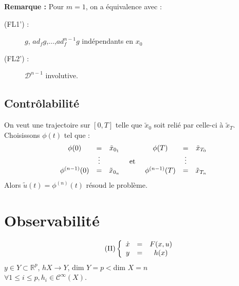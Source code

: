 \textbf{Remarque :} Pour $m=1$, on a équivalence avec :
\begin{description}
	\item[(FL1') :] $g$, $ad_fg$,...,$ad_f^{n-1}g$ indépendants en $x_0$
	\item[(FL2') :] $\mathcal{D}^{n-1}$ involutive.
\end{description}


\subsection{Contrôlabilité}
On veut une trajectoire sur $[0,T]$ telle que $\tilde{x}_0$ soit relié par celle-ci à $\tilde{x}_T$.\\
Choisissons $\phi(t)$ tel que : \[\begin{array}{c c c c c c c}
\phi(0)&=&\tilde{x}_{0_1} & & \phi(T)&=&\tilde{x}_{T_0}\\
   &\vdots& &\text{ et }&  &\vdots&\\
\phi^{(n-1)}(0)&=&\tilde{x}_{0_n} & & \phi^{(n-1)}(T)&=&\tilde{x}_{T_n}
\end{array}\]
Alors $\tilde{u}(t)=\phi^{(n)}(t)$ résoud le problème.

\section{Observabilité}
\begin{equation}\label{probComp} \tag{$\Pi$}
\left\{ \begin{array}{c c c}
	\dot{x}&=&F(x,u)\\
	y&=&h(x)
\end{array} \right.\end{equation}
$y\in Y\subset\mathbb{R}^p$, $hX\to Y$, dim $Y=p<$dim $X=n$\\
$\forall 1\leq i\leq p, h_i\in \mathcal{C}^{\infty}(X)$.


